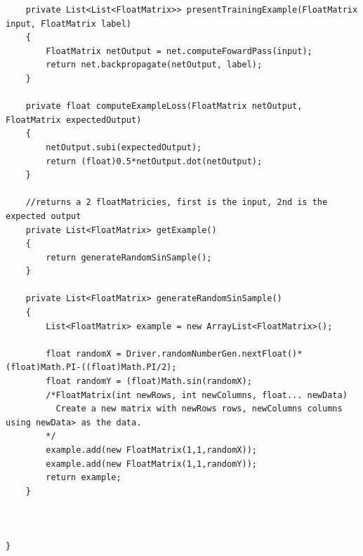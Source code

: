 \documentclass[11pt]{article} %
\begin{document}
\begin{lstlisting}
    private List<List<FloatMatrix>> presentTrainingExample(FloatMatrix input, FloatMatrix label)
    {
        FloatMatrix netOutput = net.computeFowardPass(input);
        return net.backpropagate(netOutput, label);
    }
    
    private float computeExampleLoss(FloatMatrix netOutput, FloatMatrix expectedOutput)
    {
        netOutput.subi(expectedOutput);
        return (float)0.5*netOutput.dot(netOutput);
    }
    
    //returns a 2 floatMatricies, first is the input, 2nd is the expected output
    private List<FloatMatrix> getExample()
    {
        return generateRandomSinSample();
    }
    
    private List<FloatMatrix> generateRandomSinSample()
    {
        List<FloatMatrix> example = new ArrayList<FloatMatrix>();
    
        float randomX = Driver.randomNumberGen.nextFloat()*(float)Math.PI-((float)Math.PI/2);
        float randomY = (float)Math.sin(randomX);
        /*FloatMatrix(int newRows, int newColumns, float... newData)
          Create a new matrix with newRows rows, newColumns columns using newData> as the data.
        */
        example.add(new FloatMatrix(1,1,randomX));
        example.add(new FloatMatrix(1,1,randomY));
        return example;
    }
    
 
   
}
\end{lstlisting}
\begin{lstlisting}

\end{lstlisting}
\begin{lstlisting}

\end{lstlisting}
\begin{lstlisting}

\end{lstlisting}
\begin{lstlisting}

\end{lstlisting}
\begin{lstlisting}

\end{lstlisting}
\begin{lstlisting}

\end{lstlisting}
\end{document}
